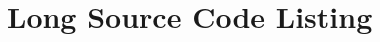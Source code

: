 \documentclass[english,bachelor]{diploma}
\begin{document}
\MakeTitlePages






%
%


\printbibliography[heading=bibintoc]

\appendix
%
%


\chapter{Long Source Code Listing}
%
\end{document}
